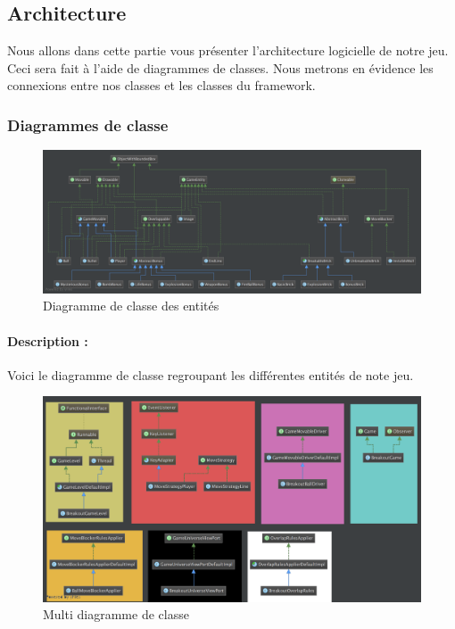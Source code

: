 \documentclass[a4paper,11pt]{article}
\begin{document}
\subsection{Architecture}
	Nous allons dans cette partie vous présenter l'architecture logicielle de notre jeu. Ceci sera fait à l'aide de diagrammes de classes.
	Nous metrons en évidence les connexions entre nos classes et les classes du framework.


	\subsubsection{Diagrammes de classe}
		
		\FloatBarrier
		\begin{figure}[!h]
    		\begin{center}
	  	  	\includegraphics[scale=0.175]{images/entitiesDiag.png}
          	\caption{Diagramme de classe des entités}
    		\end{center}
		\end{figure}
		\FloatBarrier
		\paragraph{Description :}
		Voici le diagramme de classe regroupant les différentes entités de note jeu. \\
		
		\FloatBarrier
		\begin{figure}[!h]
    		\begin{center}
	  	  	\includegraphics[scale=0.2]{images/severalDiagrams.png}
          	\caption{Multi diagramme de classe}
    		\end{center}
		\end{figure}
		\FloatBarrier
\end{document}
